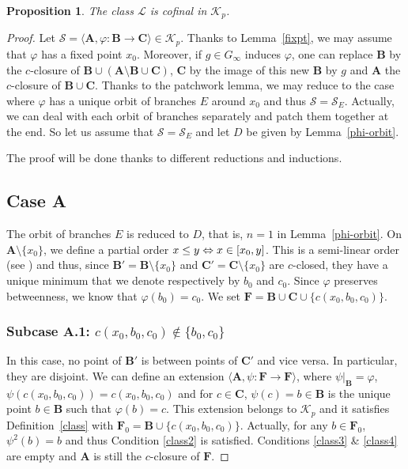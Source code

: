 \documentclass[JEP,XML,SOM,Unicode,NoFloatCountersInSection]{cedram}
\newcommand\ssi{\mathchoice{\iff}{\Leftrightarrow}{\Leftrightarrow}{\Leftrightarrow}}
\let\mathcal\mathscr
\theoremstyle{plain}
\newtheorem{prop}[thm]{Proposition}
\theoremstyle{definition}
\newcommand{\bA}{{\boldsymbol{A}}}
\newcommand{\bB}{{\boldsymbol{B}}}
\newcommand{\bC}{{\boldsymbol{C}}}
\newcommand{\bF}{{\boldsymbol{F}}}
\newcommand{\cK}{\mathcal{K}}
\newcommand{\cL}{\mathcal{L}}
\newcommand{\cS}{\mathcal{S}}
\begin{document}
\begin{prop}\label{prop:cofinal}The class $\cL$ is cofinal in $\cK_p$.
\end{prop}
\begin{proof}Let $\cS=\langle \bA,\varphi\colon\bB\to\bC\rangle\in\cK_p$. Thanks to Lemma~\ref{fixpt}, we may assume that $\varphi$ has a fixed point $x_0$.
Moreover, if $g\in G_\infty$ induces $\varphi$, one can replace $\bB$ by the $c$-closure of $\bB\cup \left(\bA\setminus \bB\cup\bC\right)$, $\bC$ by the image of this new $\bB$ by $g$ and $\bA$ the $c$-closure of $\bB\cup \bC$. Thanks to the patchwork lemma, we may reduce to the case where $\varphi$ has a unique orbit of branches $E$ around $x_0$ and thus $\cS=\cS_E$. Actually, we can deal with each orbit of branches separately and patch them together at the end. So let us assume that $\cS=\cS_E$ and let $D$ be given by Lemma~\ref{phi-orbit}.

The proof will be done thanks to different reductions and inductions.

\subsection*{Case A} The orbit of branches $E$ is reduced to $D$, that is, $n=1$ in Lemma~\ref{phi-orbit}. On $\bA\setminus\{x_0\}$, we define a partial order $x\leq y \ssi x\in[x_0,y]$. This is a semi-linear order (see \cite[\S 5]{DM_dendritesII}) and thus, since $\bB'=\bB\setminus\{x_0\}$ and $\bC'=\bC\setminus\{x_0\}$ are $c$-closed, they have a unique minimum that we denote respectively by $b_0$ and $c_0$. Since $\varphi$ preserves betweenness, we know that $\varphi(b_0)=c_0$. We set $\bF=\bB\cup\bC\cup\{c(x_0,b_0,c_0)\}$.

\subsubsection*{Subcase \textup{A.1:} $c(x_0,b_0,c_0)\notin\{b_0,c_0\}$} In this case, no point of $\bB'$ is between points of $\bC'$ and vice versa. In particular, they are disjoint. We can define an extension $\langle \bA,\psi\colon \bF\to\bF\rangle$, where $\psi|_\bB=\varphi$, $\psi(c(x_0,b_0,c_0))=c(x_0,b_0,c_0)$ and for $c\in\bC$, $\psi(c)=b\in\bB$ is the unique point $b\in\bB$ such that $\varphi(b)=c$. This extension belongs to $\cK_p$ and it satisfies Definition~\ref{class} with $\bF_0=\bB\cup\{c(x_0,b_0,c_0)\}$. Actually, for any $b\in\bF_0$, $\psi^2(b)=b$ and thus Condition \eqref{class2} is satisfied. Conditions \eqref{class3} \& \eqref{class4} are empty and $\bA$ is still the $c$-closure of $\bF$.


\end{proof}
\end{document}
